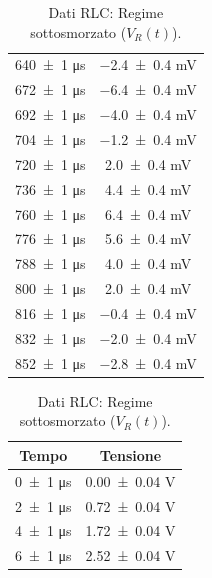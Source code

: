 \documentclass[a4paper]{article}
\begin{document}
\begin{appendices}
\begin{table}[htbp]
\begin{minipage}{0.48\textwidth}
\begin{tabular}{|c|c|}
        \num{640 \pm 1} \si{\micro\second} & \num{-2.4 \pm 0.4} \si{\milli\volt} \\
        \num{672 \pm 1} \si{\micro\second} & \num{-6.4 \pm 0.4} \si{\milli\volt} \\
        \num{692 \pm 1} \si{\micro\second} & \num{-4.0 \pm 0.4} \si{\milli\volt} \\
        \num{704 \pm 1} \si{\micro\second} & \num{-1.2 \pm 0.4} \si{\milli\volt} \\
        \num{720 \pm 1} \si{\micro\second} & \num{2.0 \pm 0.4} \si{\milli\volt} \\
        \num{736 \pm 1} \si{\micro\second} & \num{4.4 \pm 0.4} \si{\milli\volt} \\
        \num{760 \pm 1} \si{\micro\second} & \num{6.4 \pm 0.4} \si{\milli\volt} \\
        \num{776 \pm 1} \si{\micro\second} & \num{5.6 \pm 0.4} \si{\milli\volt} \\
        \num{788 \pm 1} \si{\micro\second} & \num{4.0 \pm 0.4} \si{\milli\volt} \\
        \num{800 \pm 1} \si{\micro\second} & \num{2.0 \pm 0.4} \si{\milli\volt} \\
        \num{816 \pm 1} \si{\micro\second} & \num{-0.4 \pm 0.4} \si{\milli\volt} \\ %
        \num{832 \pm 1} \si{\micro\second} & \num{-2.0 \pm 0.4} \si{\milli\volt} \\
        \num{852 \pm 1} \si{\micro\second} & \num{-2.8 \pm 0.4} \si{\milli\volt} \\
        \hline
        \end{tabular}
        \caption{Dati RLC: Regime sottosmorzato ($V_R(t)$).}
        \label{tab:rlc_data_sottosmorzato}
    \end{minipage}\hfill
    \begin{minipage}{0.48\textwidth}
        \centering\small
        \begin{tabular}{|c|c|}
        \hline
        Tempo & Tensione \\\hline\hline %
        \num{0 \pm 1} \si{\micro\second} & \num{0.00 \pm 0.04} \si{\volt} \\
        \num{2 \pm 1} \si{\micro\second} & \num{0.72 \pm 0.04} \si{\volt} \\ %
        \num{4 \pm 1} \si{\micro\second} & \num{1.72 \pm 0.04} \si{\volt} \\
        \num{6 \pm 1} \si{\micro\second} & \num{2.52 \pm 0.04} \si{\volt} \\

\end{tabular}
\end{minipage}
\end{table}
\end{appendices}
\end{document}
